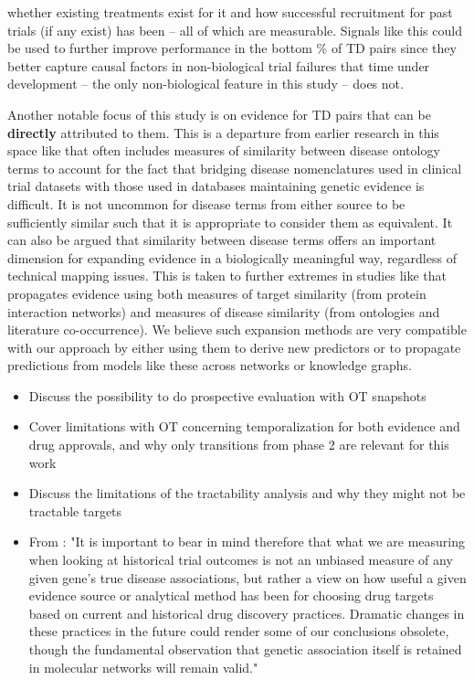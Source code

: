 \documentclass{article}
\begin{document}
whether existing treatments exist for it and how successful recruitment for past trials (if any exist) has been -- all of which are measurable. Signals like this could be used to further improve performance in the bottom \bottomRankingPct\% of TD pairs since they better capture causal factors in non-biological trial failures that time under development -- the only non-biological feature in this study -- does not.

Another notable focus of this study is on evidence for TD pairs that can be \textbf{directly} attributed to them. This is a departure from earlier research in this space like \cite{Nelson2015-eg} that often includes measures of similarity between disease ontology terms to account for the fact that bridging disease nomenclatures used in clinical trial datasets with those used in databases maintaining genetic evidence is difficult. It is not uncommon for disease terms from either source to be sufficiently similar such that it is appropriate to consider them as equivalent. It can also be argued that similarity between disease terms offers an important dimension for expanding evidence in a biologically meaningful way, regardless of technical mapping issues. This is taken to further extremes in studies like \cite{PMID:33262371} that propagates evidence using both measures of target similarity (from protein interaction networks) and measures of disease similarity (from ontologies and literature co-occurrence). We believe such expansion methods are very compatible with our approach by either using them to derive new predictors or to propagate predictions from models like these across networks or knowledge graphs.



\begin{itemize}
  \item Discuss the possibility to do prospective evaluation with OT snapshots
  \item Cover limitations with OT concerning temporalization for both evidence and drug approvals, and why only transitions from phase 2 are relevant for this work
  \item Discuss the limitations of the tractability analysis and why they might not be tractable targets
  \item From \cite{PMID:33262371}: "It is important to bear in mind therefore that what we are measuring when looking at historical trial outcomes is not an unbiased measure of any given gene's true disease associations, but rather a view on how useful a given evidence source or analytical method has been for choosing drug targets based on current and historical drug discovery practices. Dramatic changes in these practices in the future could render some of our conclusions obsolete, though the fundamental observation that genetic association itself is retained in molecular networks will remain valid."
\end{itemize}
\end{document}
